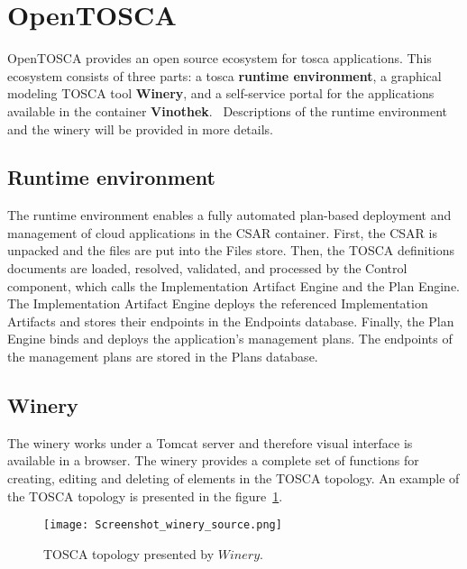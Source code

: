 \section{OpenTOSCA} \label{sec:opentosca}
OpenTOSCA provides an open source ecosystem for \gls{tosca} applications. 
This ecosystem consists of three parts: a \gls{tosca} \textbf{runtime environment}, a graphical modeling TOSCA tool \textbf{Winery}, and a self-service portal for the applications available in the container \textbf{Vinothek}.~\cite*{OpenTOSCA}
Descriptions of the runtime environment and the winery will be provided in more details. 
\subsection*{Runtime environment}
The runtime environment enables a fully automated plan-based deployment and management of cloud applications in the CSAR container. 
First, the CSAR is unpacked and the files are put into the Files store.
Then, the TOSCA definitions documents are loaded, resolved, validated, and processed by the Control component, which calls the Implementation Artifact Engine and the Plan Engine.
The Implementation Artifact Engine deploys the referenced Implementation Artifacts and stores their endpoints in the Endpoints database. 
Finally, the Plan Engine binds and deploys the application’s management plans.
The endpoints of the management plans are stored in the Plans database.~\cite{INPROC-2013-45}
\subsection*{Winery}\label{subs:wine}\label{tool:winery}
The winery works under a Tomcat server and therefore visual interface is available in a browser. %
The winery provides a complete set of functions for creating, editing and deleting of elements in the TOSCA topology. 
An example of the TOSCA topology is presented in the figure~\ref{fig:winery_source}.
\begin{figure}[ht]   
\centering
\texttt{[image: Screenshot\_winery\_source.png]}
\caption{TOSCA topology presented by $Winery$.}
\label{fig:winery_source}
\end{figure}


